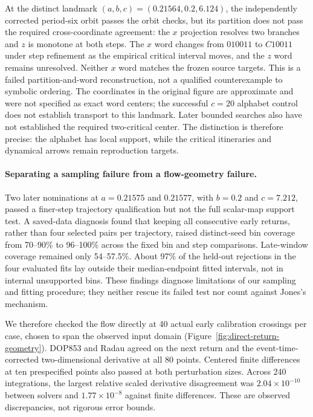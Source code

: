At the distinct landmark $(a,b,c)=(0.21564,0.2,6.124)$, the independently
corrected period-six orbit passes the orbit checks, but its partition does
not pass the required cross-coordinate agreement: the $x$ projection resolves
two branches and $z$ is monotone at both steps. The $x$ word changes from
$010011$ to $C10011$ under step refinement as the empirical critical interval
moves, and the $z$ word remains unresolved. Neither $x$ word matches the
frozen source targets. This is a failed partition-and-word reconstruction,
not a qualified counterexample to symbolic ordering. The coordinates in the
original figure are approximate and were not specified as exact word centers;
the successful $c=20$ alphabet control does not establish transport to this
landmark. Later bounded searches
also have not established the required two-critical center. The distinction
is therefore precise: the alphabet has local support, while the critical
itineraries and dynamical arrows remain reproduction targets.

\paragraph{Separating a sampling failure from a flow-geometry failure.}
Two later nominations at $a=0.21575$ and $0.21577$, with $b=0.2$ and
$c=7.212$, passed a finer-step trajectory qualification but not the full
scalar-map support test. A saved-data diagnosis found that keeping all
consecutive early returns, rather than four selected pairs per trajectory,
raised distinct-seed bin coverage from 70--90\% to 96--100\% across the fixed
bin and step comparisons. Late-window coverage remained only 54--57.5\%.
About 97\% of the held-out rejections in the four evaluated fits lay outside
their median-endpoint fitted intervals, not in internal unsupported bins.
These findings diagnose limitations of our sampling and fitting procedure;
they neither rescue its failed test nor count against Jones's mechanism.

We therefore checked the flow directly at 40 actual early calibration
crossings per case, chosen to span the observed input domain
(Figure~\ref{fig:direct-return-geometry}). DOP853 and Radau agreed on the
next return and the event-time-corrected two-dimensional derivative at all
80 points. Centered finite differences at ten prespecified points also
passed at both perturbation sizes. Across 240 integrations, the largest
relative scaled derivative disagreement was $2.04\times10^{-10}$ between
solvers and $1.77\times10^{-8}$ against finite differences. These are
observed discrepancies, not rigorous error bounds.

